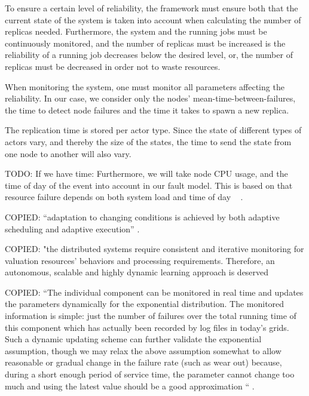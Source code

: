 \documentclass{cslthse-msc}
\begin{document}
To ensure a certain level of reliability, the framework must ensure both that the current state of the system is taken into account when calculating the number of replicas needed. Furthermore, the system and the running jobs must be continuously monitored, and the number of replicas must be increased is the reliability of a running job decreases below the desired level, or, the number of replicas must be decreased in order not to waste resources.

When monitoring the system, one must monitor all parameters affecting the reliability. In our case, we consider only the nodes' mean-time-between-failures, the time to detect node failures and the time it takes to spawn a new replica.

The replication time is stored per actor type. Since the state of different types of actors vary, and thereby the size of the states, the time to send the state from one node to another will also vary. 

TODO: If we have time:
Furthermore, we will take node CPU usage, and the time of day of the event into account in our fault model. This is based on that resource failure depends on both system load and time of day ~\cite{implicationsOfFailures} \cite{studyOfFailures}.

\iffalse
COPIED: “adaptation to changing conditions is achieved by both adaptive scheduling and adaptive execution” \cite{evalOfGridRel}.

COPIED:
"the distributed systems require consistent and iterative monitoring for valuation resources’ behaviors and processing requirements. Therefore, an autonomous, scalable and highly dynamic learning approach is deserved \cite{imprRelAdaptRL}


COPIED:
“The individual component can be monitored in real time and updates the parameters dynamically for the exponential distribution. The monitored information is simple: just the number of failures over the total running time of this component which has actually been recorded by log files in today’s grids. Such a dynamic updating scheme can further validate the exponential assumption, though we may relax the above assumption somewhat to allow reasonable or gradual change in the failure rate (such as wear out) because, during a short enough period of service time, the parameter cannot change too much and using the latest value should be a good approximation “ \cite{hierarchicalRelModeling}.
\end{document}
